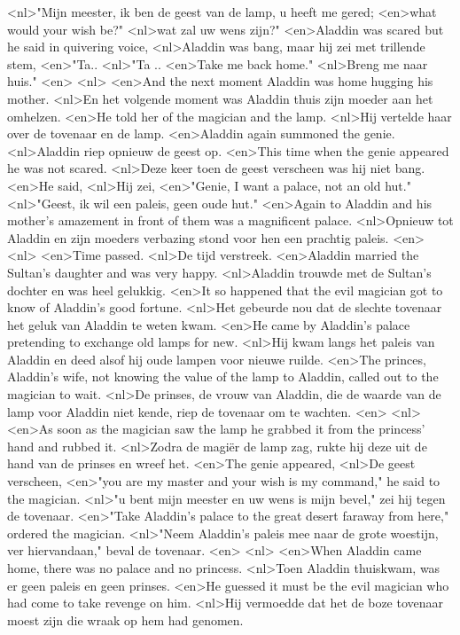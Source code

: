 <nl>"Mijn meester, ik ben de geest van de lamp, u heeft me gered;
<en>what would your wish be?"
<nl>wat zal uw wens zijn?"
<en>Aladdin was scared but he said in quivering voice,
<nl>Aladdin was bang, maar hij zei met trillende stem,
<en>"Ta..
<nl>"Ta ..
<en>Take me back home."
<nl>Breng me naar huis."
<en>
<nl>
<en>And the next moment Aladdin was home hugging his mother.
<nl>En het volgende moment was Aladdin thuis  zijn moeder aan het omhelzen.
<en>He told her of the magician and the lamp.
<nl>Hij vertelde haar over de tovenaar en de lamp.
<en>Aladdin again summoned the genie.
<nl>Aladdin riep opnieuw de geest op.
<en>This time when the genie appeared he was not scared.
<nl>Deze keer toen de geest verscheen was hij niet bang.
<en>He said,
<nl>Hij zei,
<en>"Genie, I want a palace, not an old hut."
<nl>"Geest, ik wil een paleis, geen oude hut."
<en>Again to Aladdin and his mother's amazement in front of them was a magnificent palace.
<nl>Opnieuw tot Aladdin en zijn moeders  verbazing stond voor hen een prachtig paleis.
<en>
<nl>
<en>Time passed.
<nl>De tijd verstreek.
<en>Aladdin married the Sultan's daughter and was very happy.
<nl>Aladdin trouwde met de Sultan's dochter en was heel gelukkig.
<en>It so happened that the evil magician got to know of Aladdin's good fortune.
<nl>Het gebeurde nou dat de slechte tovenaar het geluk van Aladdin te weten kwam.
<en>He came by Aladdin's palace pretending to exchange old lamps for new.
<nl>Hij kwam langs het paleis van Aladdin en deed alsof hij oude lampen voor nieuwe ruilde.
<en>The princes, Aladdin's wife, not knowing the value of the lamp to Aladdin, called out to the magician to wait.
<nl>De prinses, de vrouw van Aladdin, die de waarde van de lamp voor Aladdin niet kende, riep de tovenaar om te wachten.
<en>
<nl>
<en>As soon as the magician saw the lamp he grabbed it from the princess' hand and rubbed it.
<nl>Zodra de magiër de lamp zag, rukte hij deze uit de hand van de prinses en wreef het.
<en>The genie appeared,
<nl>De geest verscheen,
<en>"you are my master and your wish is my command," he said to the magician.
<nl>"u bent mijn meester en uw wens is mijn bevel," zei hij tegen de tovenaar.
<en>"Take Aladdin's palace to the great desert faraway from here," ordered the magician.
<nl>"Neem Aladdin's paleis mee naar de grote woestijn, ver hiervandaan," beval de tovenaar.
<en>
<nl>
<en>When Aladdin came home, there was no palace and no princess.
<nl>Toen Aladdin thuiskwam, was er geen paleis en geen prinses.
<en>He guessed it must be the evil magician who had come to take revenge on him.
<nl>Hij vermoedde dat het de boze tovenaar moest zijn die wraak op hem had genomen.
